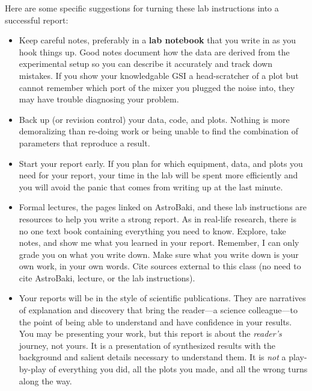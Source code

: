 \documentclass[11pt,preprint]{aastex}
\begin{document}
Here are some specific suggestions for turning these lab instructions into a successful report:
\begin{itemize}

\item Keep careful notes, preferably in a {\bf lab notebook} that you write in as you hook things up.
Good notes document how the data are derived from the experimental setup so you can describe it accurately and track down mistakes.
If you show your knowledgable GSI a head-scratcher of a plot but cannot remember
which port of the mixer you plugged the noise into, they may have trouble diagnosing your problem.

\item Back up (or revision control) your data, code, and plots. Nothing is more demoralizing than re-doing work
or being unable to find the combination of parameters that reproduce a result.

\item Start your report early. If you plan for which equipment, data, and plots you need
for your report, your time in the lab will be spent more efficiently and you will avoid the 
panic that comes from writing up at the last minute.

\item Formal lectures, the pages linked on AstroBaki, and these lab instructions are 
resources to help you write a strong report. As in real-life research, there
is no one text book containing everything you need to know. Explore, take notes, and show
me what you learned in your report. Remember, I can only grade you on what you write down.
Make sure what you write down is your own work, in your own words. Cite sources
external to this class (no need to cite AstroBaki, lecture, or the lab instructions).

\item Your reports will be in the style of scientific publications. They are narratives of explanation and discovery 
that bring the reader---a science colleague---to the point of being able to understand and have confidence in your results.
You may be presenting your work, but this report is about the {\it reader's} journey, not yours.
It is a presentation of synthesized results with the background and salient details necessary to understand them. 
It is {\it not} a play-by-play of everything you did, all the plots you made, and all the wrong turns along the way.

\end{itemize}
\end{document}
